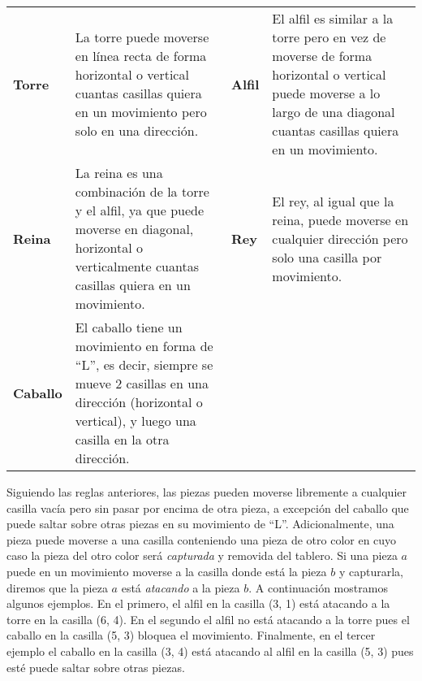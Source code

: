 \documentclass{oci}
\begin{document}
\begin{problemDescription}
\newcommand{\boardsmall}[1][]{\scalebox{0.75}{\chessboard[#1]}}
\newcommand{\vadj}{\vspace{0em}}
\def\arraystretch{1.5}
\setlength{\tabcolsep}{0em}
\begin{tabularx}{\textwidth}[t]{AB@{\hspace{.03\textwidth}}AB}
  \textbf{Torre}
  \boardsmall[setpieces={rc3}, markfields={c1,c2,c4,c5,a3,b3,d3,e3}]
  &
  \vadj
  La torre puede moverse en línea recta de forma horizontal o vertical cuantas casillas quiera en
  un movimiento pero solo en una dirección.

  &
  \textbf{Alfil}

  \boardsmall[setpieces={bc3}, markfields={a1,b2,d4,e5,a5,b4,d2,e1}]
  &
  \vadj
  El alfil es similar a la torre pero en vez de moverse de forma horizontal o vertical
  puede moverse a lo largo de una diagonal cuantas casillas quiera en un movimiento.
  \\

  \textbf{Reina}
  \boardsmall[setpieces={qc3}, markfields={a1,b2,d4,e5,a5,b4,d2,e1,c1,c2,c4,c5,a3,b3,d3,e3}]
  &
  \vspace{0.1em}
  La reina es una combinación de la torre y el alfil, ya que puede moverse en diagonal,
  horizontal o verticalmente cuantas casillas quiera en un movimiento.

  &
  \textbf{Rey}
  \boardsmall[setpieces={kc3}, markfields={b2,d4,b4,d2,c2,c4,b3,d3}]
  &
  \vspace{0.2em}
  El rey, al igual que la reina, puede moverse en cualquier dirección pero solo una casilla por
  movimiento.
  \\

  \textbf{Caballo}
  \boardsmall[setpieces={nc3}, markfields={a4,a2,b5,b1,d5,d1,e4,e2}]
  &
  \vspace{0.1em}
  El caballo tiene un movimiento en forma de ``L'', es decir, siempre se mueve
  2 casillas en una dirección (horizontal o vertical), y luego una casilla en la otra dirección.
\end{tabularx}

Siguiendo las reglas anteriores, las piezas pueden moverse libremente a cualquier casilla vacía
pero sin pasar por encima de otra pieza, a excepción del caballo que puede saltar sobre otras
piezas en su movimiento de ``L''.
Adicionalmente, una pieza puede moverse a una casilla conteniendo una pieza de otro color en cuyo
caso la pieza del otro color será \emph{capturada} y removida del tablero.
Si una pieza $a$ puede en un movimiento moverse a la casilla donde está la pieza $b$ y capturarla,
diremos que la pieza $a$ está \emph{atacando} a la pieza $b$.
A continuación mostramos algunos ejemplos.
En el primero, el alfil en la casilla (3, 1) está atacando a la torre en la casilla (6, 4).
En el segundo el alfil no está atacando a la torre pues el caballo en la casilla (5, 3)
bloquea el movimiento.
Finalmente, en el tercer ejemplo el caballo en la casilla (3, 4) está atacando al alfil
en la casilla (5, 3) pues esté puede saltar sobre otras piezas.


\end{problemDescription}
\end{document}
